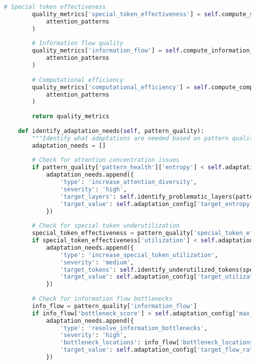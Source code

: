 \begin{lstlisting}[language=Python, caption=Attention pattern analysis and optimization framework]
        # Special token effectiveness
        quality_metrics['special_token_effectiveness'] = self.compute_special_token_effectiveness(
            attention_patterns
        )
        
        # Information flow quality
        quality_metrics['information_flow'] = self.compute_information_flow_quality(
            attention_patterns
        )
        
        # Computational efficiency
        quality_metrics['computational_efficiency'] = self.compute_computational_efficiency(
            attention_patterns
        )
        
        return quality_metrics
    
    def identify_adaptation_needs(self, pattern_quality):
        """Identify what adaptations are needed based on pattern quality."""
        adaptation_needs = []
        
        # Check for attention concentration issues
        if pattern_quality['pattern_health']['entropy'] < self.adaptation_config['min_entropy']:
            adaptation_needs.append({
                'type': 'increase_attention_diversity',
                'severity': 'high',
                'target_layers': self.identify_problematic_layers(pattern_quality, 'entropy'),
                'target_value': self.adaptation_config['target_entropy']
            })
        
        # Check for special token underutilization
        special_token_effectiveness = pattern_quality['special_token_effectiveness']
        if special_token_effectiveness['utilization'] < self.adaptation_config['min_utilization']:
            adaptation_needs.append({
                'type': 'increase_special_token_utilization',
                'severity': 'medium',
                'target_tokens': self.identify_underutilized_tokens(special_token_effectiveness),
                'target_value': self.adaptation_config['target_utilization']
            })
        
        # Check for information flow bottlenecks
        info_flow = pattern_quality['information_flow']
        if info_flow['bottleneck_score'] > self.adaptation_config['max_bottleneck']:
            adaptation_needs.append({
                'type': 'resolve_information_bottlenecks',
                'severity': 'high',
                'bottleneck_locations': info_flow['bottleneck_locations'],
                'target_value': self.adaptation_config['target_flow_rate']
            })
        

\end{lstlisting}
